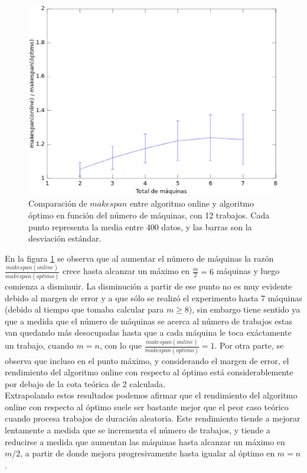 \documentclass[12pt,letterpaper]{article}
\begin{document}
\begin{figure}[ht]
\centering
\includegraphics[scale=0.75]{fig2.eps}
\caption{Comparación de $makespan$ entre algoritmo online y algoritmo óptimo en función del número de máquinas, con 12 trabajos. Cada punto representa la media entre 400 datos, y las barras son la desviación estándar.}
\label{fig:2}
\end{figure}

En la figura \ref{fig:2} se observa que al aumentar el número de máquinas la razón $\frac{makespan(online)}{makespan(optimo)}$ crece hasta alcanzar un máximo en $\frac{m}{2} = 6$ máquinas y luego comienza a disminuir. La disminución a partir de ese punto no es muy evidente debido al margen de error y a que sólo se realizó el experimento hasta 7 máquinas (debido al tiempo que tomaba calcular para $m \geq 8$), sin embargo tiene sentido ya que a medida que el número de máquinas se acerca al número de trabajos estas van quedando más desocupadas hasta que a cada máquina le toca exáctamente un trabajo, cuando $m = n$, con lo que $\frac{makespan(online)}{makespan(optimo)} = 1$. Por otra parte, se observa que incluso en el punto máximo, y considerando el margen de error, el rendimiento del algoritmo online con respecto al óptimo está considerablemente por debajo de la cota teórica de 2 calculada. \\

Extrapolando estos resultados podemos afirmar que el rendimiento del algoritmo online con respecto al óptimo suele ser bastante mejor que el peor caso teórico cuando procesa trabajos de duración aleatoria. Este rendimiento tiende a mejorar lentamente a medida que se incrementa el número de trabajos, y tiende a reducirse a medida que aumentan las máquinas hasta alcanzar un máximo en $m/2$, a partir de donde mejora progresivamente hasta igualar al óptimo en $m = n$.
\end{document}
